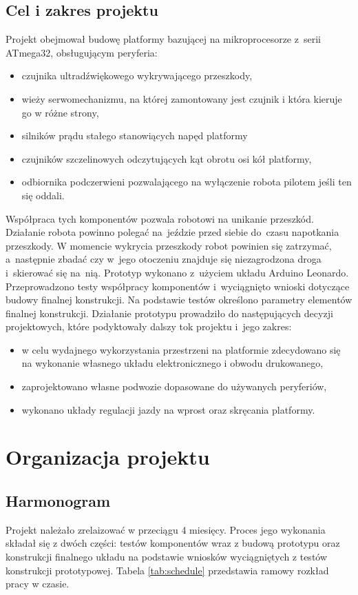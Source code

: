 \documentclass[11pt]{article}
\begin{document}
\subsection{Cel i zakres projektu}
Projekt obejmował budowę platformy bazującej na mikroprocesorze z~serii ATmega32, obsługującym peryferia:
\begin{itemize}
	\item czujnika ultradźwiękowego wykrywającego przeszkody,
	\item wieży serwomechanizmu, na której zamontowany jest czujnik i która kieruje go w różne strony,
	\item silników prądu stałego stanowiących napęd platformy
	\item czujników szczelinowych odczytujących kąt obrotu osi kół platformy,
	\item odbiornika podczerwieni pozwalającego na wyłączenie robota pilotem jeśli ten się oddali.
\end{itemize}
Współpraca tych komponentów pozwala robotowi na unikanie przeszkód.
Działanie robota powinno polegać na~jeździe przed siebie do~czasu napotkania przeszkody.
W momencie wykrycia przeszkody robot powinien się zatrzymać, a~następnie zbadać czy w~jego otoczeniu znajduje się niezagrodzona droga i~skierować się na~nią.
Prototyp wykonano z~użyciem układu Arduino Leonardo.
Przeprowadzono testy współpracy komponentów i~wyciągnięto wnioski dotyczące budowy finalnej konstrukcji.
Na podstawie testów określono parametry elementów finalnej konstrukcji.
Działanie prototypu prowadziło do następujących decyzji projektowych, które podyktowały dalszy tok projektu i~jego zakres:
\begin{itemize}
	\item w celu wydajnego wykorzystania przestrzeni na platformie zdecydowano się na wykonanie własnego układu elektronicznego i obwodu drukowanego,
	\item zaprojektowano własne podwozie dopasowane do używanych peryferiów,
	\item wykonano układy regulacji jazdy na wprost oraz skręcania platformy.
\end{itemize}

\section{Organizacja projektu}
\subsection{Harmonogram}
Projekt należało zrelaizować w przeciągu 4 miesięcy.
Proces jego wykonania składał się z dwóch części: testów komponentów wraz z budową prototypu oraz konstrukcji finalnego układu na podstawie wniosków wyciągniętych z testów konstrukcji prototypowej.
	Tabela \ref{tab:schedule} przedstawia ramowy rozkład pracy w czasie.
\end{document}
